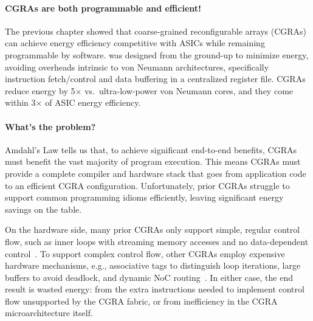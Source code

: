 \paragraph{CGRAs are both programmable and efficient!}
%
The previous chapter showed that coarse-grained reconfigurable
arrays (CGRAs) can achieve energy efficiency competitive with ASICs
while remaining programmable by software.
%
%
\snafu was designed from the ground-up to minimize energy, avoiding overheads intrinsic to von
Neumann architectures, specifically instruction fetch/control and data
buffering in a centralized register file.
% 
%
\snafu CGRAs reduce energy by 5$\times$ vs.\ ultra-low-power von Neumann
cores, and they come within 3$\times$ of ASIC energy efficiency.

\figRipTideIntro

\paragraph{What's the problem?}
%
Amdahl's Law tells us that, to achieve significant end-to-end benefits,
CGRAs must benefit the vast majority of program execution.
%
This means CGRAs must provide a complete compiler and hardware stack
that goes from application code to an efficient CGRA configuration.
%
Unfortunately, prior CGRAs struggle to support common programming
idioms efficiently, leaving significant energy savings on the table.

On the hardware side,
%
many prior CGRAs only support simple, regular control flow,
such as inner loops with streaming memory accesses
and no data-dependent control~\cite{plasticine,nowatzki:isca17:stream-dataflow,snafu}.
%
To support complex control flow, other CGRAs employ expensive hardware mechanisms, e.g.,
associative tags to distinguish loop iterations,
large buffers to avoid deadlock,
and dynamic NoC routing~\cite{monsoon,ttda,swanson2003wavescalar,voitsechov2014single}.
%
In either case, the end result is wasted energy:
%
from the extra instructions needed to implement control flow unsupported
by the CGRA fabric,
%
or from inefficiency in the CGRA microarchitecture itself.

